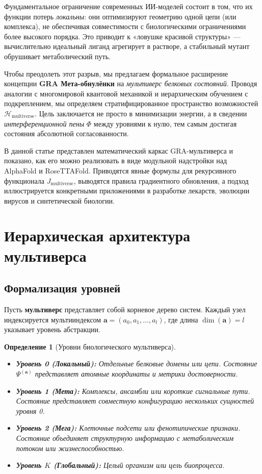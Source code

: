 \documentclass[11pt]{article}
\newtheorem{definition}[theorem]{Определение}
\newcommand{\cH}{\mathcal{H}}
\begin{document}
Фундаментальное ограничение современных ИИ-моделей состоит в том, что их функции потерь \emph{локальны}: они оптимизируют геометрию одной цепи (или комплекса), не обеспечивая совместимости с биологическими ограничениями более высокого порядка. Это приводит к «ловушке красивой структуры» — вычислительно идеальный лиганд агрегирует в растворе, а стабильный мутант обрушивает метаболический путь.

Чтобы преодолеть этот разрыв, мы предлагаем формальное расширение концепции \textbf{GRA Мета-обнулёнки} на \emph{мультиверс белковых состояний}. Проводя аналогии с многомировой квантовой механикой и иерархическим обучением с подкреплением, мы определяем стратифицированное пространство возможностей \(\cH_{\text{multiverse}}\). Цель заключается не просто в минимизации энергии, а в сведении \emph{интерференционной пены} \(\Phi\) между уровнями к нулю, тем самым достигая состояния абсолютной согласованности.

В данной статье представлен математический каркас GRA-мультиверса и показано, как его можно реализовать в виде модульной надстройки над AlphaFold и RoseTTAFold. Приводятся явные формулы для рекурсивного функционала \(J_{\text{multiverse}}\), выводятся правила градиентного обновления, а подход иллюстрируется конкретными приложениями в разработке лекарств, эволюции вирусов и синтетической биологии.

\section{Иерархическая архитектура мультиверса}

\subsection{Формализация уровней}

Пусть \textbf{мультиверс} представляет собой корневое дерево систем. Каждый узел индексируется мультииндексом \(\mathbf{a} = (a_0, a_1, \dots, a_l)\), где длина \(\dim(\mathbf{a}) = l\) указывает уровень абстракции.

\begin{definition}[Уровни биологического мультиверса]
\begin{itemize}[leftmargin=*]
    \item \textbf{Уровень 0 (Локальный):} Отдельные белковые домены или цепи. Состояние \(\Psi^{(\mathbf{a})}\) представляет атомные координаты и метрики достоверности.
    \item \textbf{Уровень 1 (Мета):} Комплексы, ансамбли или короткие сигнальные пути. Состояние представляет совместную конфигурацию нескольких сущностей уровня 0.
    \item \textbf{Уровень 2 (Мега):} Клеточные подсети или фенотипические признаки. Состояние объединяет структурную информацию с метаболическим потоком или жизнеспособностью.
    \item \textbf{Уровень \(K\) (Глобальный):} Целый организм или цель биопроцесса.
\end{itemize}
\end{definition}
\end{document}
